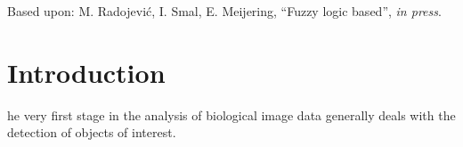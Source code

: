 \smallskip


\begin{publish}
Based upon: M. Radojevi\'{c}, I. Smal, E. Meijering, ``Fuzzy logic based'', \textit{in press}.   
\end{publish}

\section{Introduction}
\label{ch2__sec:intro}
he very first stage in the analysis of biological image data generally deals with the detection of objects of interest.